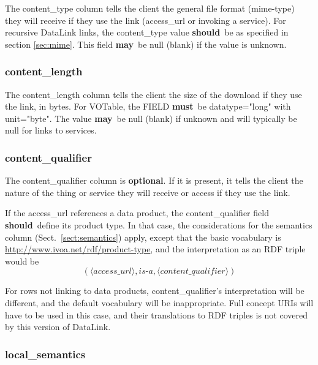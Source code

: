 \documentclass[11pt,a4paper]{ivoa}
\newcommand{\attval}[2]{#1={\allowbreak}{"}#2{"}}
\newcommand{\rfcmust}{\textbf{must}}
\newcommand{\rfcshould}{\textbf{should}}
\newcommand{\rfcmay}{\textbf{may}}
\newcommand{\rfcoptional}{\textbf{optional}}
\begin{document}
The content\_type column tells the client the general file format
(mime-type) they will receive if they use the link
(access\_url or invoking a service).
For recursive DataLink links, the content\_type value \rfcshould\
be as specified in section \ref{sec:mime}.
This field \rfcmay\ be null (blank) if the value is unknown.

\subsubsection{content\_length}

The content\_length column tells the client the size of the download
if they use the link, in bytes. For VOTable, the FIELD \rfcmust\ be
\attval{datatype}{long} with \attval{unit}{byte}.
The value \rfcmay\ be null (blank)
if unknown and will typically be null for links to services.

\subsubsection{content\_qualifier}
\label{sec:contentQualifier}

The content\_qualifier column is \rfcoptional. If it is present, it tells
the client the nature of the thing or service they will receive or access
if they use the link.

If the access\_url references a data product, the content\_qualifier
field \rfcshould\ define its product type.  In that case, the considerations
for the semantics column (Sect.~\ref{sect:semantics}) apply, except that
the basic vocabulary is \url{http://www.ivoa.net/rdf/product-type}, and
the interpretation as an RDF triple would be $$(
\langle\textit{access\_url}\rangle, \textit{is-a},
\langle\textit{content\_qualifier}\rangle)$$

For rows not linking to data products, content\_qualifier's
interpretation will be different, and the default vocabulary will be
inappropriate.  Full concept URIs will have to be used in this case, and
their translations to RDF triples is not covered by this version of
DataLink.

\subsubsection{local\_semantics}
\label{sec:localSemantics}
\end{document}
